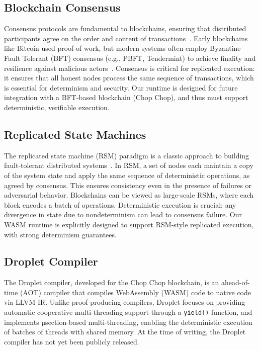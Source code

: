 \documentclass[10pt,a4paper,twocolumn]{IEEEtran}
\begin{document}
\subsection{Blockchain Consensus}
Consensus protocols are fundamental to blockchains, ensuring that distributed participants agree on the order and content of transactions~\cite{bitcoin,blockchain_tutorial}. Early blockchains like Bitcoin used proof-of-work, but modern systems often employ Byzantine Fault Tolerant (BFT) consensus (e.g., PBFT, Tendermint) to achieve finality and resilience against malicious actors~\cite{castro_liskov_pbft,tendermint}. Consensus is critical for replicated execution: it ensures that all honest nodes process the same sequence of transactions, which is essential for determinism and security. Our runtime is designed for future integration with a BFT-based blockchain (Chop Chop), and thus must support deterministic, verifiable execution.

\subsection{Replicated State Machines}
The replicated state machine (RSM) paradigm is a classic approach to building fault-tolerant distributed systems~\cite{schneider_smr,bonomi_smr}. In RSM, a set of nodes each maintain a copy of the system state and apply the same sequence of deterministic operations, as agreed by consensus. This ensures consistency even in the presence of failures or adversarial behavior. Blockchains can be viewed as large-scale RSMs, where each block encodes a batch of operations. Deterministic execution is crucial: any divergence in state due to nondeterminism can lead to consensus failure. Our WASM runtime is explicitly designed to support RSM-style replicated execution, with strong determinism guarantees.

\subsection{Droplet Compiler}
The Droplet compiler, developed for the Chop Chop blockchain, is an ahead-of-time (AOT) compiler that compiles WebAssembly (WASM) code to native code via LLVM IR. Unlike proof-producing compilers, Droplet focuses on providing automatic cooperative multi-threading support through a \texttt{yield()} function, and implements µsection-based multi-threading, enabling the deterministic execution of batches of threads with shared memory. At the time of writing, the Droplet compiler has not yet been publicly released.
\end{document}
